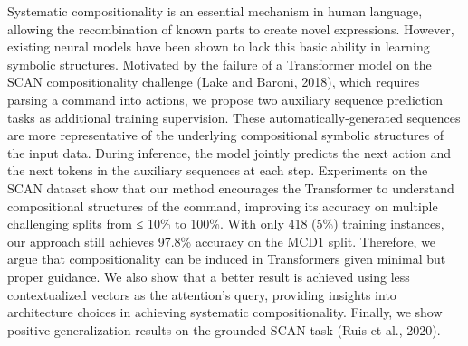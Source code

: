 Systematic compositionality is an essential mechanism in human language, allowing the recombination of known parts to create novel expressions. However, existing neural models have been shown to lack this basic ability in learning symbolic structures. Motivated by the failure of a Transformer model on the SCAN compositionality challenge (Lake and Baroni, 2018), which requires parsing a command into actions, we propose two auxiliary sequence prediction tasks as additional training supervision. These automatically-generated sequences are more representative of the underlying compositional symbolic structures of the input data. During inference, the model jointly predicts the next action and the next tokens in the auxiliary sequences at each step. Experiments on the SCAN dataset show that our method encourages the Transformer to understand compositional structures of the command, improving its accuracy on multiple challenging splits from ≤ 10\% to 100\%. With only 418 (5\%) training instances, our approach still achieves 97.8\% accuracy on the MCD1 split. Therefore, we argue that compositionality can be induced in Transformers given minimal but proper guidance. We also show that a better result is achieved using less contextualized vectors as the attention's query, providing insights into architecture choices in achieving systematic compositionality. Finally, we show positive generalization results on the grounded-SCAN task (Ruis et al., 2020).
